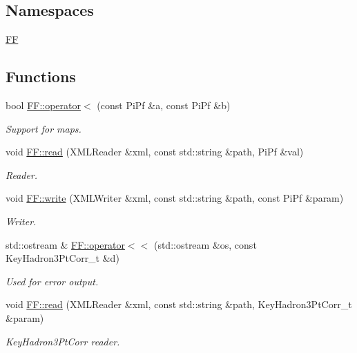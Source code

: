 \subsection*{Namespaces}
\begin{DoxyCompactItemize}
\item 
 \mbox{\hyperlink{namespaceFF}{FF}}
\end{DoxyCompactItemize}
\subsection*{Functions}
\begin{DoxyCompactItemize}
\item 
bool \mbox{\hyperlink{namespaceFF_ab2fad4623f8e931f162863b3dbff7a29}{F\+F\+::operator$<$}} (const Pi\+Pf \&a, const Pi\+Pf \&b)
\begin{DoxyCompactList}\small\item\em Support for maps. \end{DoxyCompactList}\item 
void \mbox{\hyperlink{namespaceFF_a951fc6aa6ba4be7a0eb44c600fce48f0}{F\+F\+::read}} (X\+M\+L\+Reader \&xml, const std\+::string \&path, Pi\+Pf \&val)
\begin{DoxyCompactList}\small\item\em Reader. \end{DoxyCompactList}\item 
void \mbox{\hyperlink{namespaceFF_a5f456c76a7fdfa1dd9305ebda8793354}{F\+F\+::write}} (X\+M\+L\+Writer \&xml, const std\+::string \&path, const Pi\+Pf \&param)
\begin{DoxyCompactList}\small\item\em Writer. \end{DoxyCompactList}\item 
std\+::ostream \& \mbox{\hyperlink{namespaceFF_aec2159c099eb8feb14ba92b783ce7493}{F\+F\+::operator$<$$<$}} (std\+::ostream \&os, const Key\+Hadron3\+Pt\+Corr\+\_\+t \&d)
\begin{DoxyCompactList}\small\item\em Used for error output. \end{DoxyCompactList}\item 
void \mbox{\hyperlink{namespaceFF_a457d1bd921b678eadc34fb2dbfcbdb32}{F\+F\+::read}} (X\+M\+L\+Reader \&xml, const std\+::string \&path, Key\+Hadron3\+Pt\+Corr\+\_\+t \&param)
\begin{DoxyCompactList}\small\item\em Key\+Hadron3\+Pt\+Corr reader. \end{DoxyCompactList}\item 

\end{DoxyCompactItemize}
